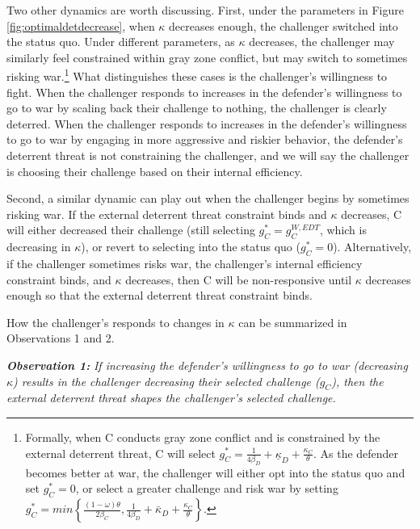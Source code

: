 \documentclass[11pt,letterpaper,pdftex,dvipsnames,table]{article}
\begin{document}
Two other dynamics are worth discussing. First, under the parameters in Figure \ref{fig:optimaldetdecrease}, when $\kappa$ decreases enough, the challenger switched into the status quo. Under different parameters, as $\kappa$ decreases, the challenger may similarly feel constrained within gray zone conflict, but may switch to sometimes risking war.\footnote{Formally, when C conducts gray zone conflict and is constrained by the external deterrent threat, C will select $g_{C}^{*}=\frac{1}{4\beta_{D}}+\underline{\kappa}_{D}+\frac{\kappa_{C}}{\theta}$. As the defender becomes better at war, the challenger will either opt into the status quo and set $g_{C}^{*}=0$, or select a greater challenge and risk war by setting $g_{C}^{*}=min\left\{ \frac{(1-\omega)\theta}{2\beta_{C}},\frac{1}{4\beta_{D}}+\bar{\kappa}_{D}+\frac{\kappa_{C}}{\theta}\right\} $. %
} What distinguishes these cases is the challenger's willingness to fight. When the challenger responds to increases in the defender's willingness to go to war by scaling back their challenge to nothing, the challenger is clearly deterred. When the challenger responds to increases in the defender's willingness to go to war by engaging in more aggressive and riskier behavior, the defender's deterrent threat is not constraining the challenger, and we will say the challenger is choosing their challenge based on their internal efficiency.

Second, a similar dynamic can play out when the challenger begins by sometimes risking war. If the external deterrent threat constraint binds and $\kappa$ decreases, C will either decreased their challenge (still selecting $g_{C}^{*}=g_{C}^{W,EDT}$, which is decreasing in $\kappa$), or revert to selecting into the status quo ($g_{C}^{*}=0$). Alternatively, if the challenger sometimes risks war, the challenger's internal efficiency constraint binds, and $\kappa$ decreases, then C will be non-responsive until $\kappa$ decreases enough so that the external deterrent threat constraint binds. 

How the challenger's responds to changes in $\kappa$ can be summarized in Observations 1 and 2. 

\textbf{\textit{Observation 1:}}\textit{ If increasing the defender's willingness to go to war (decreasing $\kappa$) results in the challenger decreasing their selected challenge ($g_{C}$), then the external deterrent threat shapes the challenger's selected challenge.}
\end{document}
